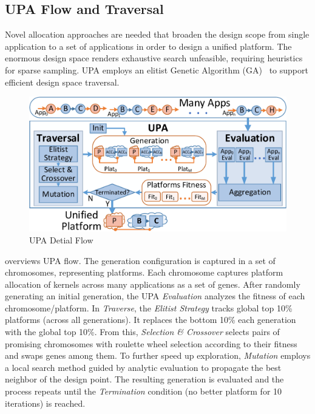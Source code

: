 \newcommand{\dsename}[1]{\textit{#1}}

\vspace{-2pt}
\subsection{UPA Flow and Traversal}
\label{subsec:MAAR}

Novel allocation approaches are needed that broaden the design scope from single application to a set of applications in order to design a unified platform. The enormous design space renders exhaustive search unfeasible, requiring heuristics for sparse sampling. UPA employs an elitist Genetic Algorithm (GA)~\cite{quan2014towards} to support efficient design space traversal.

\begin{figure}[h]
	\centering
	\includegraphics[width=.9\linewidth]{fig/MAARflowDetial.pdf}
	\vspace{-4pt}
	\caption{UPA Detial Flow}
	\label{fig:MAARflowDetial}
\end{figure}

 overviews UPA flow. The generation configuration is captured in a set of chromosomes, representing platforms. Each chromosome captures platform allocation of kernels across many applications as a set of genes. After randomly generating an initial generation, the UPA \dsename{Evaluation} analyzes the fitness of each chromosome/platform. In \dsename{Traverse}, the \dsename{Elitist Strategy} tracks global top 10\% platforms (across all generations). It replaces the bottom 10\% each generation with the global top 10\%. From this, \dsename{Selection \& Crossover} selects pairs of promising chromosomes with roulette wheel selection according to their fitness and swaps genes among them. To further speed up exploration, \dsename{Mutation} employs a local search method guided by analytic evaluation to propagate the best neighbor of the design point. The resulting generation is evaluated and the process repeats until the \dsename{Termination} condition (no better platform for 10 iterations) is reached.